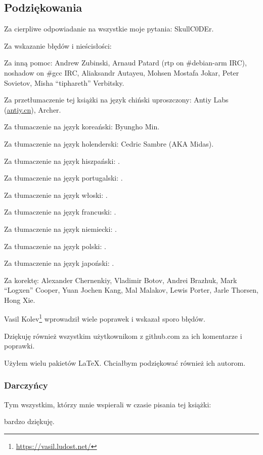 \subsection*{Podziękowania}

Za cierpliwe odpowiadanie na wszystkie moje pytania: SkullC0DEr.

Za wskazanie błędów i nieścisłości: \PeopleMistakesInaccuracies{}

Za inną pomoc:
Andrew Zubinski,
Arnaud Patard (rtp on \#debian-arm IRC),
noshadow on \#gcc IRC,
Aliaksandr Autayeu,
Mohsen Mostafa Jokar,
Peter Sovietov,
Misha ``tiphareth'' Verbitsky.

Za przetłumaczenie tej książki na język chiński uproszczony:
Antiy Labs (\href{http://antiy.cn}{antiy.cn}), Archer.

Za tłumaczenie na język koreański: Byungho Min.

Za tłumaczenie na język holenderski: Cedric Sambre (AKA Midas).

Za tłumaczenie na język hiszpański: \PeopleSpanishTranslators{}.

Za tłumaczenie na język portugalski: \PeoplePTBRTranslators{}.

Za tłumaczenie na język włoski: \PeopleItalianTranslators{}.

Za tłumaczenie na język francuski: \PeopleFrenchTranslators{}.

Za tłumaczenie na język niemiecki: \PeopleGermanTranslators{}.

Za tłumaczenie na język polski: \PeoplePolishTranslators{}.

Za tłumaczenie na język japoński: \PeopleJapaneseTranslators{}.

Za korektę:
Alexander  Chernenkiy,
Vladimir Botov,
Andrei Brazhuk,
Mark ``Logxen'' Cooper, Yuan Jochen Kang, Mal Malakov, Lewis Porter, Jarle Thorsen, Hong Xie.

Vasil Kolev\footnote{\url{https://vasil.ludost.net/}} wprowadził wiele poprawek i wskazał sporo błędów.

Dziękuję również wszystkim użytkownikom z github.com za ich komentarze i poprawki.

Użyłem wielu pakietów \LaTeX. Chciałbym podziękować również ich autorom.

\subsubsection*{Darczyńcy}

Tym wszystkim, którzy mnie wspierali w czasie pisania tej książki:



bardzo dziękuję.
